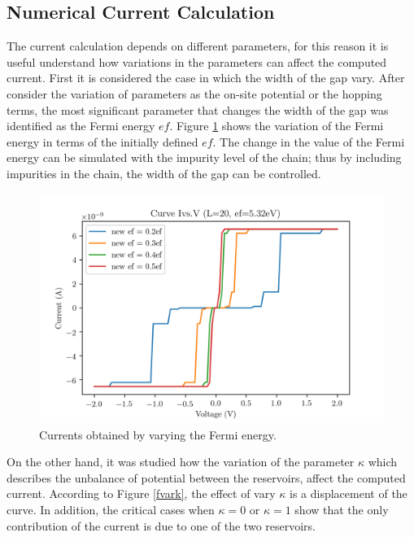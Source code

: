 \documentclass[12pt]{article}
\begin{document}
\clearpage
\subsection{Numerical Current Calculation}

The current calculation depends on different parameters, for this reason it is useful understand how variations in the parameters can affect the computed current. First it is considered the case in which the width of the gap vary. After consider the variation of parameters as the on-site potential or the hopping terms, the most significant parameter that changes the width of the gap was identified as the Fermi energy $ef$. Figure \ref{fcurr} shows the variation of the Fermi energy in terms of the initially defined $ef$. The change in the value of the Fermi energy can be simulated with the impurity level of the chain; thus by including impurities in the chain, the width of the gap can be controlled.

\begin{figure}[ht]
    \centering
    \includegraphics[scale=0.75]{Current.png}
    \caption{Currents obtained by varying the Fermi energy.}
    \label{fcurr}
\end{figure}

On the other hand, it was studied how the variation of the parameter $\kappa$ which describes the unbalance of potential between the reservoirs, affect the computed current. According to Figure \ref{fvark}, the effect of vary $\kappa$ is a displacement of the curve. In addition, the critical cases when $\kappa = 0$ or $\kappa = 1$ show that the only contribution of the current is due to one of the two reservoirs.
\end{document}

